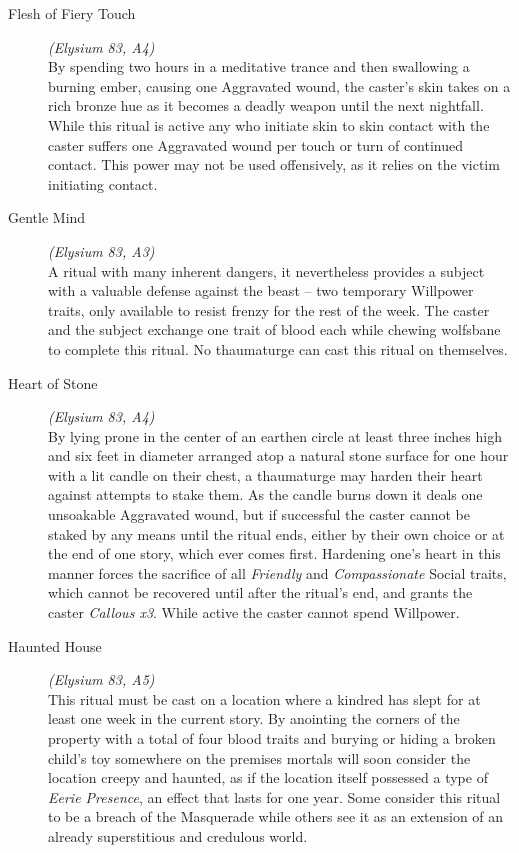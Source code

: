 \begin{description}
	\item[Flesh of Fiery Touch] \emph{(Elysium 83, A4)} \hfill \\
	By spending two hours in a meditative trance and then swallowing a burning ember, causing one Aggravated wound, the caster's 
	skin takes on a rich bronze hue as it becomes a deadly weapon until the next nightfall.  While this ritual is active any who 
	initiate skin to skin contact with the caster suffers one Aggravated wound per touch or turn of continued contact.  This power 
	may not be used offensively, as it relies on the victim initiating contact. \\

	\item[Gentle Mind] \emph{(Elysium 83, A3)} \hfill \\
	A ritual with many inherent dangers, it nevertheless provides a subject with a valuable defense against the beast -- two 
	temporary Willpower traits, only available to resist frenzy for the rest of the week.  The caster and the subject exchange one 
	trait of blood each while chewing wolfsbane to complete this ritual.  No thaumaturge can cast this ritual on themselves. \\

	\item[Heart of Stone] \emph{(Elysium 83, A4)} \hfill \\
	By lying prone in the center of an earthen circle at least three inches high and six feet in diameter arranged atop a natural 
	stone surface for one hour with a lit candle on their chest, a thaumaturge may harden their heart against attempts to stake them.  
	As the candle burns down it deals one unsoakable Aggravated wound, but if successful the caster cannot be staked by any means 
	until the ritual ends, either by their own choice or at the end of one story, which ever comes first.  Hardening one's heart in 
	this manner forces the sacrifice of all \emph{Friendly} and \emph{Compassionate} Social traits, which cannot be recovered until 
	after the ritual's end, and grants the caster \emph{Callous x3}.  While active the caster cannot spend Willpower. \\

	\item[Haunted House] \emph{(Elysium 83, A5)} \hfill \\
	This ritual must be cast on a location where a kindred has slept for at least one week in the current story. By anointing the 
	corners of the property with a total of four blood traits and burying or hiding a broken child's toy somewhere on the premises 
	mortals will soon consider the location creepy and haunted, as if the location itself possessed a type of \emph{Eerie Presence}, 
	an effect that lasts for one year.  Some consider this ritual to be a breach of the Masquerade while others see it as an extension 
	of an already superstitious and credulous world. \\


\end{description}
